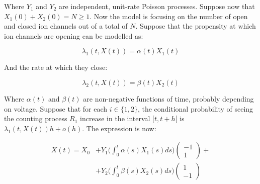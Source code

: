 Where $Y_1$ and $Y_2$ are independent, unit-rate Poisson processes.
Suppose now that $X_1(0) + X_2(0) = N\ge 1$.
Now the model is focusing on the number of open and closed ion channels out of a total of $N$.
Suppose that the propensity at which ion channels are opening can be modelled as:

$$\lambda_1(t, X(t)) = \alpha(t)X_1(t)$$

And the rate at which they close:

$$\lambda_2(t, X(t)) = \beta(t)X_2(t)$$

Where $\alpha(t)$ and $\beta(t)$ are non-negative functions of time, probably depending on voltage.
Suppose that for each $i\in\{1, 2\}$, the conditional probability of seeing the counting process $R_1$ increase in the interval $[t, t+h[$ is $\lambda_1(t, X(t))h+o(h)$.
The expression is now:

\begin{align*}
	X(t) = X_0 &+ Y_1\biggl(\int_0^t\alpha(s)X_1(s)ds\biggr)\begin{pmatrix}-1\\1\end{pmatrix} +\\
						 &+Y_2\biggl(\int_0^t\beta(s)X_2(s)ds\biggr)\begin{pmatrix}1\\-1\end{pmatrix}
\end{align*}




